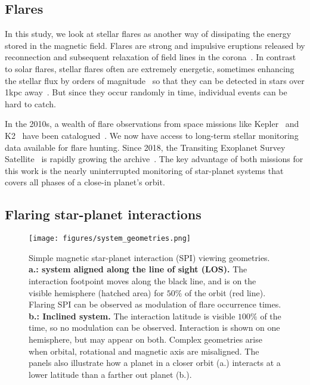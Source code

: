 \documentclass[twocolumn]{aastex631}
\begin{document}
\subsection{Flares}
\label{sec:intro:flares}
In this study, we look at stellar flares as another way of dissipating the energy stored in the magnetic field. Flares are strong and impulsive eruptions released by reconnection and subsequent relaxation of field lines in the corona~\citep{svestka1976solar,priest2002magnetic}. In contrast to solar flares, stellar flares often are extremely energetic, sometimes enhancing the stellar flux by orders of magnitude~\citep{maehara2012superflares, shibayama2013superflares, paudel2018k2} so that they can be detected in stars over 1kpc away~\citep{chang2015photometric}. But since they occur randomly in time, individual events can be hard to catch. %

In the 2010s, a wealth of flare observations from space missions like Kepler~\citep{borucki2010kepler} and K2~\citep{howell2014k2} have been catalogued~\citep{davenport2016kepler, paudel2018k2, ilin2021flares}. We now have access to long-term stellar monitoring data available for flare hunting. Since 2018, the Transiting Exoplanet Survey Satellite~\citep{ricker2015transiting} is rapidly growing the archive~\citep{gunther2020stellar}. The key advantage of both missions for this work is the nearly uninterrupted monitoring of star-planet systems that covers all phases of a close-in planet's orbit.

\subsection{Flaring star-planet interactions}
\label{sec:intro:fspi}

\begin{figure*}[ht!]
    \begin{centering}
        \texttt{[image: figures/system\_geometries.png]}
        \caption{
         Simple magnetic star-planet interaction (SPI) viewing geometries. \textbf{a.: system aligned along the line of sight (LOS). } The interaction footpoint moves along the black line, and is on the visible hemisphere (hatched area) for $50\%$ of the  orbit (red line). Flaring SPI can be observed as modulation of flare occurrence times. \textbf{b.: Inclined system.} The interaction latitude is visible $100\%$ of the time, so no modulation can be observed. Interaction is shown on one hemisphere, but may appear on both. Complex geometries arise when orbital, rotational and magnetic axis are misaligned. The panels also illustrate how a planet in a closer orbit (a.) interacts at a lower latitude than a farther out planet (b.). }
        \label{fig:sketch}
    \end{centering}
\end{figure*}
\end{document}
